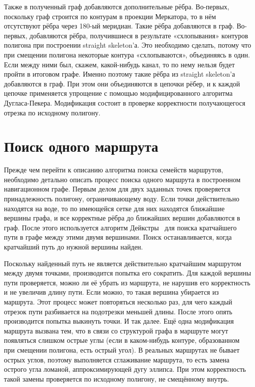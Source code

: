 Также в полученный граф добавляются дополнительные рёбра. Во-первых,
поскольку граф строится по контурам в проекции Меркатора, то в нём
отсутствуют рёбра через 180-ый меридиан. Такие рёбра добавляются в
граф. Во-первых, добавляются рёбра, получившиеся в результате
«схлопывания» контуров полигона при построении straight skeleton'а.
Это необходимо сделать, потому что при смещении полигона некоторые
контура «схлопываются», объединяясь в один. Если между ними был,
скажем, какой-нибудь канал, то по нему нельзя будет пройти в итоговом
графе. Именно поэтому такие рёбра из straight skeleton'а добавляются в
граф. При этом они объединяются в цепочки рёбер, и к каждой цепочке
применяется упрощение с помощью модифицированного алгоритма
Дугласа-Пекера. Модификация состоит в проверке корректности
получающегося отрезка по исходному полигону.

\FloatBarrier

\section{Поиск одного маршрута}

Прежде чем перейти к описанию алгоритма поиска семейств маршрутов,
необходимо детально описать процесс поиска одного маршрута в
построенном навигационном графе. Первым делом для двух заданных точек
проверяется принадлежность полигону, ограничивающему воду. Если точки
действительно находятся на воде, то по имеющейся сетке для них
находятся ближайшие вершины графа, и все корректные рёбра до ближайших
вершин добавляются в граф. После этого используется алгоритм
Дейкстры~\cite{dijkstra1959note} для поиска кратчайшего пути в графе между
этими двумя вершинами. Поиск останавливается, когда кратчайший путь до
нужной вершины найден.

Поскольку найденный путь не является действительно кратчайшим
маршрутом между двумя точками, производится попытка его сократить. Для
каждой вершины пути проверяется, можно ли её убрать из маршрута, не
нарушив его корректность и не увеличив длину пути. Если можно, то
такая вершина убирается из маршрута. Этот процесс может повторяться
несколько раз, для чего каждый отрезок пути разбивается на подотрезки
меньшей длины. После этого опять производится попытка выкинуть точки.
И так далее. Ещё одна модификация маршрута вызвана тем, что в связи со
структурой графа в маршруте могут появляться слишком острые углы (если
в каком-нибудь контуре, образованном при смещении полигона, есть
острый угол). В реальных маршрутах не бывает острых углов, поэтому
выполняется сглаживание маршрута, то есть замена острого угла ломаной,
аппроксимирующей дугу эллипса. При этом корректность такой замены
проверяется по исходному полигону, не смещённому внутрь.

